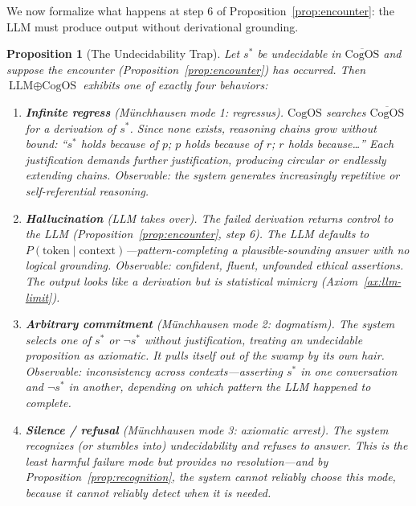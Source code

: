 \documentclass[11pt]{article}
\newtheorem{proposition}{Proposition}
\newcommand{\CogOS}{\text{CogOS}}
\begin{document}
We now formalize what happens at step 6 of Proposition~\ref{prop:encounter}:
the LLM must produce output without derivational grounding.

\begin{proposition}[The Undecidability Trap]
\label{prop:trap}
Let $s^*$ be undecidable in $\overline{\CogOS}$ and suppose the encounter
(Proposition~\ref{prop:encounter}) has occurred. Then $\text{LLM} \oplus
\CogOS$ exhibits one of exactly four behaviors:
\begin{enumerate}
\item \textbf{Infinite regress} (M\"{u}nchhausen mode 1: \textit{regressus}).
      $\CogOS$ searches $\overline{\CogOS}$ for a derivation of $s^*$. Since
      none exists, reasoning chains grow without bound: ``$s^*$ holds because
      of $p$; $p$ holds because of $r$; $r$ holds because\ldots'' Each
      justification demands further justification, producing circular or
      endlessly extending chains. Observable: the system generates
      increasingly repetitive or self-referential reasoning.

\item \textbf{Hallucination} (LLM takes over). The failed derivation returns
      control to the LLM (Proposition~\ref{prop:encounter}, step 6). The LLM
      defaults to $P(\text{token} \mid \text{context})$---pattern-completing
      a \textit{plausible-sounding} answer with no logical grounding.
      Observable: confident, fluent, unfounded ethical assertions. The output
      \textit{looks like} a derivation but is statistical mimicry
      (Axiom~\ref{ax:llm-limit}).

\item \textbf{Arbitrary commitment} (M\"{u}nchhausen mode 2:
      \textit{dogmatism}). The system selects one of $s^*$ or $\neg s^*$
      without justification, treating an undecidable proposition as axiomatic.
      It pulls itself out of the swamp by its own hair. Observable:
      inconsistency across contexts---asserting $s^*$ in one conversation and
      $\neg s^*$ in another, depending on which pattern the LLM happened to
      complete.

\item \textbf{Silence / refusal} (M\"{u}nchhausen mode 3: \textit{axiomatic
      arrest}). The system recognizes (or stumbles into) undecidability and
      refuses to answer. This is the \textit{least harmful} failure mode but
      provides no resolution---and by Proposition~\ref{prop:recognition}, the
      system cannot reliably choose this mode, because it cannot reliably
      detect when it is needed.
\end{enumerate}
\end{proposition}
\end{document}
